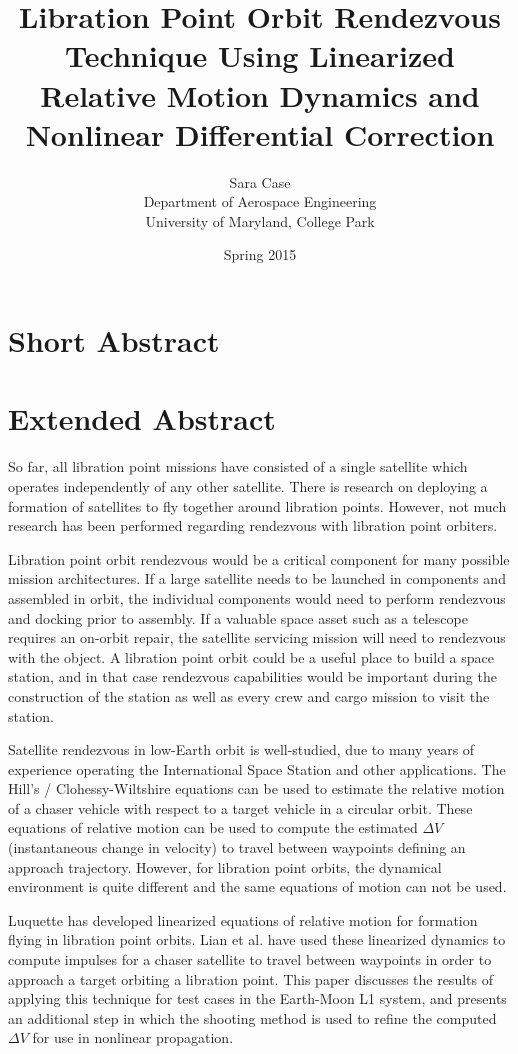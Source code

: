 \documentclass[a4paper]{article}
\title{Libration Point Orbit Rendezvous Technique Using Linearized Relative Motion Dynamics and Nonlinear Differential Correction}
\author{Sara Case\\ Department of Aerospace Engineering\\ University of Maryland, College Park}
\date{Spring 2015}
\begin{document}
\maketitle


\section{Short Abstract}

\newpage

\section{Extended Abstract}

So far, all libration point missions have consisted of a single satellite which operates independently of any other satellite.  There is research on deploying a formation of satellites to fly together around libration points.  However, not much research has been performed regarding rendezvous with libration point orbiters.

Libration point orbit rendezvous would be a critical component for many possible mission architectures.  If a large satellite needs to be launched in components and assembled in orbit, the individual components would need to perform rendezvous and docking prior to assembly.  If a valuable space asset such as a telescope requires an on-orbit repair, the satellite servicing mission will need to rendezvous with the object.  A libration point orbit could be a useful place to build a space station, and in that case rendezvous capabilities would be important during the construction of the station as well as every crew and cargo mission to visit the station.

Satellite rendezvous in low-Earth orbit is well-studied, due to many years of experience operating the International Space Station and other applications.  The Hill's / Clohessy-Wiltshire equations can be used to estimate the relative motion of a chaser vehicle with respect to a target vehicle in a circular orbit.  These equations of relative motion can be used to compute the estimated \(\Delta V\) (instantaneous change in velocity) to travel between waypoints defining an approach trajectory.  However, for libration point orbits, the dynamical environment is quite different and the same equations of motion can not be used.

Luquette \cite{luquette2004} has developed linearized equations of relative motion for formation flying in libration point orbits.  Lian et al. \cite{lian2011} have used these linearized dynamics to compute impulses for a chaser satellite to travel between waypoints in order to approach a target orbiting a libration point.  This paper discusses the results of applying this technique for test cases in the Earth-Moon L1 system, and presents an additional step in which the shooting method is used to refine the computed \(\Delta V\) for use in nonlinear propagation.
\end{document}

